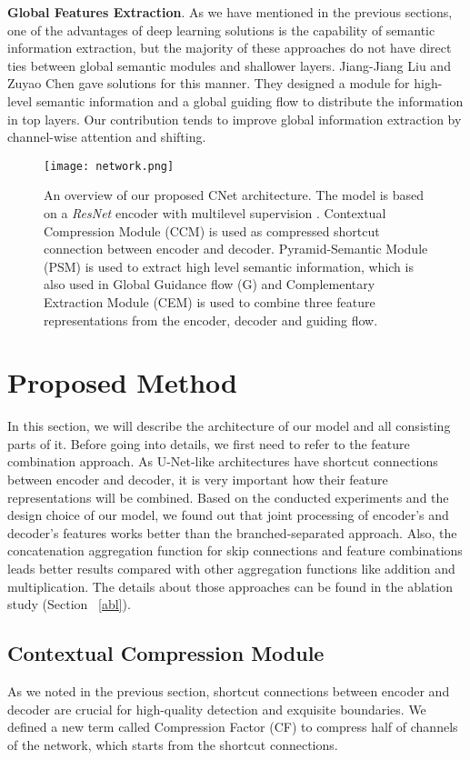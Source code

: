 \documentclass[10pt,twocolumn,letterpaper]{article}
\begin{document}
\textbf{Global Features Extraction}. As we have mentioned in the previous sections, one of the advantages of deep learning solutions is the capability of semantic information extraction, but the majority of these approaches do not have direct ties between global semantic modules and shallower layers. Jiang-Jiang Liu \etal \cite{PoolNet} and Zuyao Chen \etal \cite{GCPANet} gave solutions for this manner. They designed a module for high-level semantic information and a global guiding flow to distribute the information in top layers. Our contribution tends to improve global information extraction by channel-wise attention and shifting.

\begin{figure*}[t]
\begin{center}
\texttt{[image: network.png]}
\end{center}
   \caption{An overview of our proposed CNet architecture. The model is based on a \textit{ResNet} \cite{ResNet} encoder with multilevel supervision . Contextual Compression Module (CCM) is used as compressed shortcut connection between encoder and decoder. Pyramid-Semantic Module (PSM) is used to extract high level semantic information, which is also used in Global Guidance flow (G) and Complementary Extraction Module (CEM) is used to combine three feature representations from the encoder, decoder and guiding flow.}
\label{fig:network}
\end{figure*}

\section{Proposed Method}
\label{pm}
In this section, we will describe the architecture of our model and all consisting parts of it. Before going into details, we first need to refer to the feature combination approach. As U-Net-like architectures have shortcut connections between encoder and decoder, it is very important how their feature representations will be combined. Based on the conducted experiments and the design choice of our model, we found out that joint processing of encoder's and decoder's features works better than the branched-separated approach. Also, the concatenation aggregation function for skip connections and feature combinations leads better results compared with other aggregation functions like addition and multiplication. The details about those approaches can be found in the ablation study (Section ~\ref{abl}).

\subsection{Contextual Compression Module}
As we noted in the previous section, shortcut connections between encoder and decoder are crucial for high-quality detection and exquisite boundaries. We defined a new term called Compression Factor (CF) to compress half of channels of the network, which starts from the shortcut connections.
\end{document}
